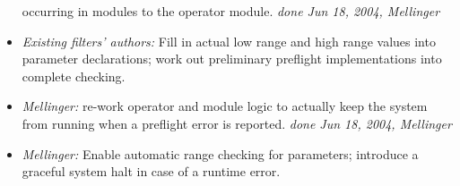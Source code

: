 \documentclass[12pt,a4paper]{article}
\begin{document}
\begin{flushleft}
\begin{itemize}
occurring in modules to the operator module.
  \textit{done Jun 18, 2004, Mellinger}
\item \textit{Existing filters' authors:} Fill in actual low range and high range 
values into parameter declarations; work out preliminary preflight implementations 
into complete checking.
\item \textit{Mellinger:} re-work operator and module logic to actually keep the system from running when a preflight error is reported.
  \textit{done Jun 18, 2004, Mellinger}
\item \textit{Mellinger:} Enable automatic range checking for parameters; introduce a graceful system halt in case of a runtime error.
\end{itemize}
\end{flushleft}
\end{document}
